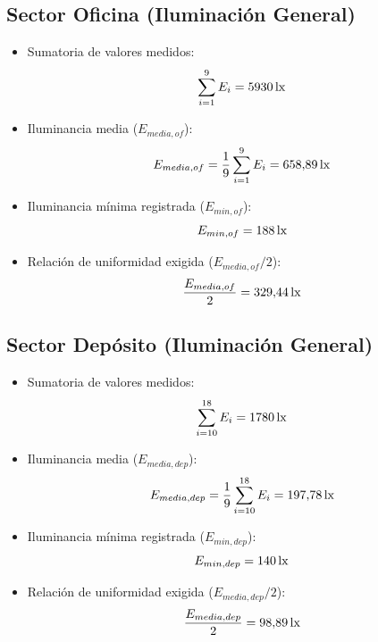 \subsection{Sector Oficina (Iluminación General)}
\begin{itemize}
    \item Sumatoria de valores medidos:
    \begin{equation}
        \sum_{i=1}^{9} E_i = 5930 \,\mathrm{lx}
    \end{equation}
    \item Iluminancia media ($E_{media,of}$):
    \begin{equation}
        E_{media,of} = \frac{1}{9} \sum_{i=1}^{9} E_i = 658{,}89 \,\mathrm{lx}
    \end{equation}
    \item Iluminancia mínima registrada ($E_{min,of}$):
    \begin{equation}
        E_{min,of} = 188 \,\mathrm{lx}
    \end{equation}
    \item Relación de uniformidad exigida ($E_{media,of}/2$):
    \begin{equation}
        \frac{E_{media,of}}{2} = 329{,}44 \,\mathrm{lx}
    \end{equation}
\end{itemize}

\subsection{Sector Depósito (Iluminación General)}
\begin{itemize}
    \item Sumatoria de valores medidos:
    \begin{equation}
        \sum_{i=10}^{18} E_i = 1780 \,\mathrm{lx}
    \end{equation}
    \item Iluminancia media ($E_{media,dep}$):
    \begin{equation}
        E_{media,dep} = \frac{1}{9} \sum_{i=10}^{18} E_i = 197{,}78 \,\mathrm{lx}
    \end{equation}
    \item Iluminancia mínima registrada ($E_{min,dep}$):
    \begin{equation}
        E_{min,dep} = 140 \,\mathrm{lx}
    \end{equation}
    \item Relación de uniformidad exigida ($E_{media,dep}/2$):
    \begin{equation}
        \frac{E_{media,dep}}{2} = 98{,}89 \,\mathrm{lx}
    \end{equation}
\end{itemize}

